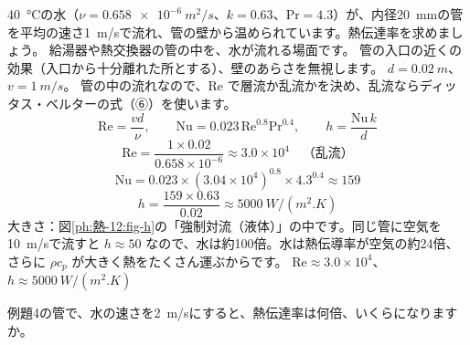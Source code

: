 \label{ph:熱-12:ex4}
\begin{phreidai}[水道管の中の水の熱伝達率]
\qty{40}{\celsius}の水（$\nu=\qty{0.658e-6}{m^2/s}$、$k=0.63$、$\mathrm{Pr}=4.3$）が、内径\qty{20}{mm}の管を平均の速さ\qty{1}{m/s}で流れ、管の壁から温められています。熱伝達率を求めましょう。
\phbamen
給湯器や熱交換器の管の中を、水が流れる場面です。
\phmushi
管の入口の近くの効果（入口から十分離れた所とする）、壁のあらさを無視します。
\phzu
$d=\qty{0.02}{m}$、$v=\qty{1}{m/s}$。
\phriyu
管の中の流れなので、Re で層流か乱流かを決め、乱流ならディッタス・ベルターの式（⑥）を使います。
\phtateru
\[\mathrm{Re}=\frac{vd}{\nu},\qquad\mathrm{Nu}=0.023\,\mathrm{Re}^{0.8}\mathrm{Pr}^{0.4},\qquad h=\frac{\mathrm{Nu}\,k}{d}\]
\phtoku
\[\mathrm{Re}=\frac{1\times0.02}{0.658\times10^{-6}}\approx3.0\times10^4\quad\text{（乱流）}\]
\[\mathrm{Nu}=0.023\times(3.04\times10^4)^{0.8}\times4.3^{0.4}\approx159\]
\[h=\frac{159\times0.63}{0.02}\approx\qty{5000}{W/(m^2.K)}\]
\phtashikame
大きさ：図\ref{ph:熱-12:fig-h}の「強制対流（液体）」の中です。同じ管に空気を\qty{10}{m/s}で流すと $h\approx50$ なので、水は約100倍。水は熱伝導率が空気の約24倍、さらに $\rho c_p$ が大きく熱をたくさん運ぶからです。
\kotae $\mathrm{Re}\approx3.0\times10^4$、$h\approx\qty{5000}{W/(m^2.K)}$
\end{phreidai}
\begin{jibun}
例題4の管で、水の速さを\qty{2}{m/s}にすると、熱伝達率は何倍、いくらになりますか。
\end{jibun}

